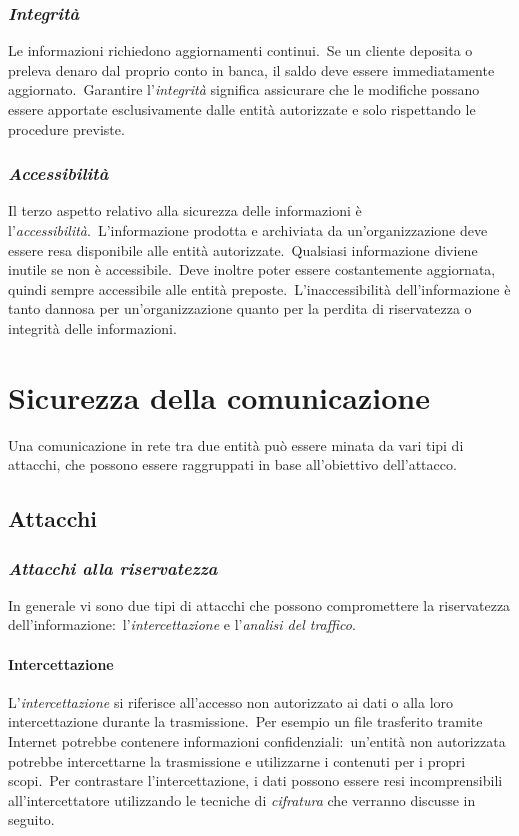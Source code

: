 \subsubsection{\textit{Integrità}}

Le informazioni richiedono aggiornamenti continui.\
Se un cliente deposita o preleva denaro dal proprio conto in banca, il saldo deve essere immediatamente aggiornato.\
Garantire l'\textit{integrità} significa assicurare che le modifiche possano essere apportate esclusivamente dalle entità autorizzate e solo rispettando le procedure previste.

\subsubsection{\textit{Accessibilità}}

Il terzo aspetto relativo alla sicurezza delle informazioni è l'\textit{accessibilità}.\
L'informazione prodotta e archiviata da un'organizzazione deve essere resa disponibile alle entità autorizzate.\
Qualsiasi informazione diviene inutile se non è accessibile.\
Deve inoltre poter essere costantemente aggiornata, quindi sempre accessibile alle entità preposte.\
L'inaccessibilità dell'informazione è tanto dannosa per un'organizzazione quanto per la perdita di riservatezza o integrità delle informazioni.

\section{Sicurezza della comunicazione}

Una comunicazione in rete tra due entità può essere minata da vari tipi di attacchi, che possono essere raggruppati in base all'obiettivo dell'attacco.

\subsection{Attacchi}

\subsubsection{\textit{Attacchi alla riservatezza}}

In generale vi sono due tipi di attacchi che possono compromettere la riservatezza dell'informazione:\ l'\textit{intercettazione} e l'\textit{analisi del traffico}.

\paragraph{Intercettazione} L'\textit{intercettazione} si riferisce all'accesso non autorizzato ai dati o alla loro intercettazione durante la trasmissione.\
Per esempio un file trasferito tramite Internet potrebbe contenere informazioni confidenziali:\ un'entità non autorizzata potrebbe intercettarne la trasmissione e utilizzarne i contenuti per i propri scopi.\
Per contrastare l'intercettazione, i dati possono essere resi incomprensibili all'intercettatore utilizzando le tecniche di \textit{cifratura} che verranno discusse in seguito.

